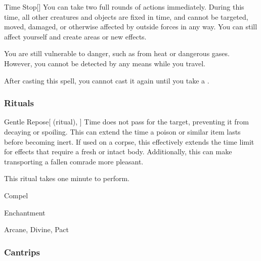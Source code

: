 \lowercase{\hypertarget{spell:Time Stop}{}}\label{spell:Time Stop}
\begin{freeability}[Rank 8]{\hypertarget{spell:Time Stop}{Time Stop}}[]
You can take two full rounds of actions immediately.
During this time, all other creatures and objects are fixed in time, and cannot be targeted, moved, damaged, or otherwise affected by outside forces in any way.
You can still affect yourself and create areas or new effects.

You are still vulnerable to danger, such as from heat or dangerous gases.
However, you cannot be detected by any means while you travel.

After casting this spell, you cannot cast it again until you take a .
\end{freeability}
\vspace{0.25em}



\subsubsection{Rituals}


\lowercase{\hypertarget{spell:Gentle Repose}{}}\label{spell:Gentle Repose}
\begin{attuneability}[Rank 3]{\hypertarget{spell:Gentle Repose}{Gentle Repose}}[ (ritual), ]
Time does not pass for the target, preventing it from decaying or spoiling.
This can extend the time a poison or similar item lasts before becoming inert.
If used on a corpse, this effectively extends the time limit for effects that require a fresh or intact body.
Additionally, this can make transporting a fallen comrade more pleasant.


This ritual takes one minute to perform.
\end{attuneability}
\vspace{0.25em}


\newpage
\begin{spellsection}{Compel}

\begin{spellheader}
\end{spellheader}


 Enchantment

 Arcane, Divine, Pact

\subsubsection{Cantrips}


\end{spellsection}


